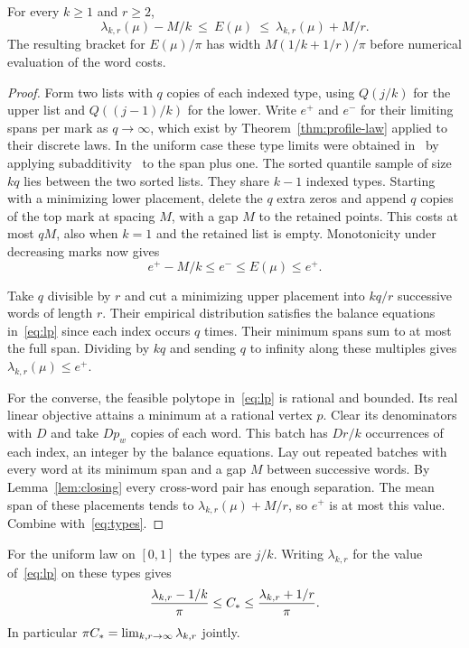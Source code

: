 \begin{theorem}\label{thm:profile-words}
For every $k\ge1$ and $r\ge2$,
\[
 \lambda_{k,r}(\mu)-M/k\ \le\ E(\mu)\ \le\ \lambda_{k,r}(\mu)+M/r.
\]
The resulting bracket for $E(\mu)/\pi$ has width $M(1/k+1/r)/\pi$
before numerical evaluation of the word costs.
\end{theorem}
\begin{proof}
Form two lists with $q$ copies of each indexed type, using $Q(j/k)$
for the upper list and $Q((j-1)/k)$ for the lower. Write $e^+$ and $e^-$
for their limiting spans per mark as $q\to\infty$, which exist by
Theorem~\ref{thm:profile-law} applied to their discrete laws. In the
uniform case these type limits were obtained in~\cite{supp} by applying
subadditivity~\cite[Theorem~4.9]{walters} to the span plus one.
The sorted
quantile sample of size $kq$ lies between the two sorted lists. They
share $k-1$ indexed types. Starting with a minimizing lower placement,
delete the $q$ extra zeros and append $q$ copies of the top mark at
spacing $M$, with a gap $M$ to the retained points. This costs at most
$qM$, also when $k=1$ and the retained list is empty. Monotonicity under
decreasing marks now gives
\begin{equation}\label{eq:types}
 e^+-M/k\le e^-\le E(\mu)\le e^+ .
\end{equation}

Take $q$ divisible by $r$ and cut a minimizing upper placement into
$kq/r$ successive words of length $r$. Their empirical distribution
satisfies the balance equations in~\eqref{eq:lp} since each index occurs $q$ times.
Their minimum spans sum to at most the full span. Dividing by $kq$
and sending $q$ to infinity along these multiples gives
$\lambda_{k,r}(\mu)\le e^+$.

For the converse, the feasible polytope in~\eqref{eq:lp} is rational
and bounded. Its real linear objective attains a minimum at a rational
vertex $p$. Clear its denominators with $D$ and take $Dp_w$ copies of
each word. This batch has $Dr/k$ occurrences of each index, an integer
by the balance equations. Lay out repeated batches with every word at
its minimum span and a gap $M$ between successive words. By
Lemma~\ref{lem:closing} every cross-word pair has enough separation.
The mean span of these placements tends to $\lambda_{k,r}(\mu)+M/r$,
so $e^+$ is at most this value. Combine with~\eqref{eq:types}.
\end{proof}

\begin{corollary}\label{thm:lp}
For the uniform law on $[0,1]$ the types are $j/k$. Writing
$\lambda_{k,r}$ for the value of~\eqref{eq:lp} on these types gives
\begin{equation}\label{eq:effective}
 \frac{\lambda_{k,r}-1/k}{\pi}\le C_\ast\le
 \frac{\lambda_{k,r}+1/r}{\pi}.
\end{equation}
In particular $\pi C_\ast=\lim_{k,r\to\infty}\lambda_{k,r}$ jointly.
\end{corollary}

